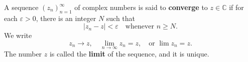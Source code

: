 A sequence $(z_n)_{n=1}^{\infty}$ of complex numbers is said to \textbf{converge} to $z \in \mathbb{C}$ if for each $\varepsilon > 0$, there is an integer $N$ such that
$$|z_n - z| < \varepsilon \quad \text{whenever } n \geq N.$$
We write
$$z_n \to z, \quad \lim_{n \to \infty} z_n = z, \quad \text{or } \lim z_n = z.$$
The number $z$ is called the \textbf{limit} of the sequence, and it is unique.
